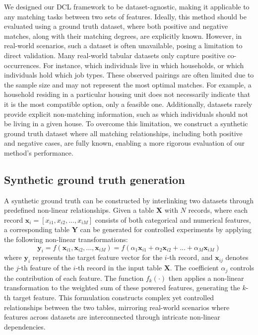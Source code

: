 \documentclass[]{nature_mod}
\begin{document}
We designed our DCL framework to be dataset-agnostic, making it applicable to any matching tasks between two sets of features. Ideally, this method should be evaluated using a ground truth dataset, where both positive and negative matches, along with their matching degrees, are explicitly known. However, in real-world scenarios, such a dataset is often unavailable, posing a limitation to direct validation. Many real-world tabular datasets only capture positive co-occurrences. For instance, which individuals live in which households, or which individuals hold which job types. These observed pairings are often limited due to the sample size and may not represent the most optimal matches. For example, a household residing in a particular housing unit does not necessarily indicate that it is the most compatible option, only a feasible one. Additionally, datasets rarely provide explicit non-matching information, such as which individuals should not be living in a given house. To overcome this limitation, we construct a synthetic ground truth dataset where all matching relationships, including both positive and negative cases, are fully known, enabling a more rigorous evaluation of our method’s performance.

\subsection{Synthetic ground truth generation}
\label{sec:synthetic_data}


A synthetic ground truth can be constructed by interlinking two datasets through predefined non-linear relationships. Given a table $\mathbf{X}$ with $N$ records, where each record $\mathbf{x}_i = [x_{i1}, x_{i2}, ..., x_{iM}]$ consists of both categorical and numerical features, a corresponding table $\mathbf{Y}$ can be generated for controlled experiments by applying the following non-linear transformations:
\begin{equation}
  \mathbf{y}_i = f(\mathbf{x}_{i1}, \mathbf{x}_{i2}, ..., \mathbf{x}_{iM}) = f(\alpha_1\mathbf{x}_{i1} + \alpha_2\mathbf{x}_{i2} + ... + \alpha_M\mathbf{x}_{iM})
\end{equation}
where $\mathbf{y}_i$ represents the target feature vector for the $i$-th record, and $\mathbf{x}_{ij}$ denotes the $j$-th feature of the $i$-th record in the input table $ \mathbf{X}$. The coefficient $\alpha_j$ controls the contribution of each feature. The function $f_k(\cdot)$ then applies a non-linear transformation to the weighted sum of these powered features, generating the $k$-th target feature. This formulation constructs complex yet controlled relationships between the two tables, mirroring real-world scenarios where features across datasets are interconnected through intricate non-linear dependencies. 
\end{document}
